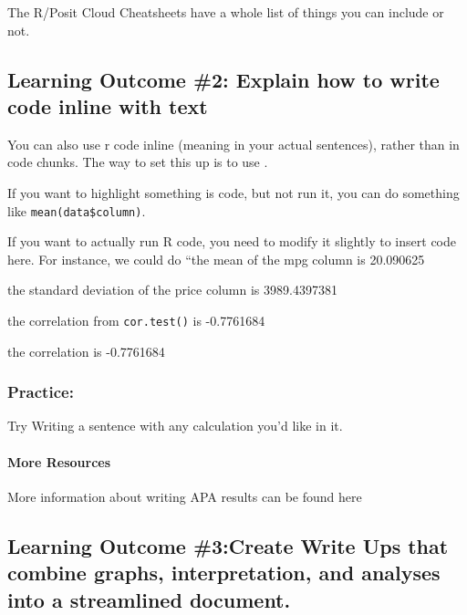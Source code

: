 \documentclass[
]{article}
\newenvironment{Shaded}{\begin{snugshade}}{\end{snugshade}}
\newcommand{\FunctionTok}[1]{\textcolor[rgb]{0.13,0.29,0.53}{\textbf{#1}}}
\newcommand{\NormalTok}[1]{#1}
\newcommand{\OtherTok}[1]{\textcolor[rgb]{0.56,0.35,0.01}{#1}}
\newcommand{\SpecialCharTok}[1]{\textcolor[rgb]{0.81,0.36,0.00}{\textbf{#1}}}
\begin{document}
The R/Posit Cloud Cheatsheets have a whole list of things you can
include or not.

\subsection{Learning Outcome \#2: Explain how to write code inline with
text}\label{learning-outcome-2-explain-how-to-write-code-inline-with-text}

You can also use r code inline (meaning in your actual sentences),
rather than in code chunks. The way to set this up is to use \texttt{}.

If you want to highlight something is code, but not run it, you can do
something like \texttt{mean(data\$column)}.

If you want to actually run R code, you need to modify it slightly to
insert code here. For instance, we could do ``the mean of the mpg column
is 20.090625

the standard deviation of the price column is 3989.4397381

\begin{Shaded}
\end{Shaded}

the correlation from \texttt{cor.test()} is -0.7761684

the correlation is -0.7761684

\subsubsection{Practice:}\label{practice-1}

Try Writing a sentence with any calculation you'd like in it.

\paragraph{More Resources}\label{more-resources-1}

More information about writing APA results can be found here

\subsection{Learning Outcome \#3:Create Write Ups that combine graphs,
interpretation, and analyses into a streamlined
document.}\label{learning-outcome-3create-write-ups-that-combine-graphs-interpretation-and-analyses-into-a-streamlined-document.}
\end{document}
